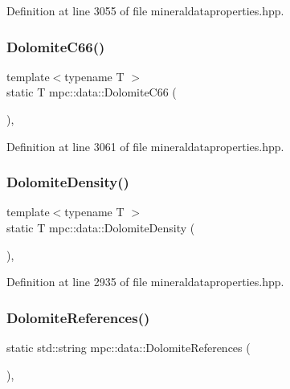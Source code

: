 Definition at line 3055 of file mineraldataproperties.\+hpp.

\mbox{\label{namespacempc_1_1data_aa7bee5f2451711445b104cc02ae05e04}} 
\subsubsection{\texorpdfstring{Dolomite\+C66()}{DolomiteC66()}}
{\footnotesize\ttfamily template$<$typename T $>$ \\
static T mpc\+::data\+::\+Dolomite\+C66 (\begin{DoxyParamCaption}{ }\end{DoxyParamCaption})\hspace{0.3cm}{\ttfamily [inline]}, {\ttfamily [static]}}



Definition at line 3061 of file mineraldataproperties.\+hpp.

\mbox{\label{namespacempc_1_1data_adddf5f5e62913d6a4cf88eef02d0efd5}} 
\subsubsection{\texorpdfstring{Dolomite\+Density()}{DolomiteDensity()}}
{\footnotesize\ttfamily template$<$typename T $>$ \\
static T mpc\+::data\+::\+Dolomite\+Density (\begin{DoxyParamCaption}{ }\end{DoxyParamCaption})\hspace{0.3cm}{\ttfamily [inline]}, {\ttfamily [static]}}



Definition at line 2935 of file mineraldataproperties.\+hpp.

\mbox{\label{namespacempc_1_1data_a084c7c33af3278c88d9d509a0985f43a}} 
\subsubsection{\texorpdfstring{Dolomite\+References()}{DolomiteReferences()}}
{\footnotesize\ttfamily static std\+::string mpc\+::data\+::\+Dolomite\+References (\begin{DoxyParamCaption}{ }\end{DoxyParamCaption})\hspace{0.3cm}{\ttfamily [inline]}, {\ttfamily [static]}}



